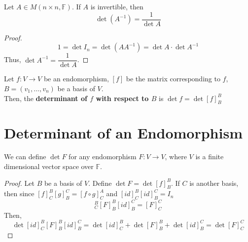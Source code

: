\documentclass[letterpaper,12pt]{article}
\begin{document}
\begin{corollary}
Let $A \in M(n \times n, \mathbb{F})$. If $A$ is invertible, then
\begin{equation*}
    \boxed{\det{(A^{-1})} = \dfrac{1}{\det{A}}}
\end{equation*}
\end{corollary}
\begin{proof}
\begin{equation*}
    1 = \det{I_n} = \det{(AA^{-1})} = \det{A} \cdot \det{A^{-1}}
\end{equation*}
Thus, $\det{A^{-1}} = \dfrac{1}{\det{A}}$.
\end{proof}

\begin{definition}
Let $f: V \rightarrow V$ be an endomorphism, $[f]$ be the matrix corresponding to $f$, $B = (v_1, \dots, v_n)$ be a basis of $V$.
\\ Then, the \textbf{determinant of $f$ with respect to $B$} is $\det{f} = \det{[f]_B^B}$
\end{definition}

\section*{Determinant of an Endomorphism}
\begin{corollary}
We can define $\det{F}$ for any endomorphism $F: V \longrightarrow V$, where $V$ is a finite dimensional vector space over $\mathbb{F}$.
\end{corollary}
\begin{proof}
Let $B$ be a basis of $V$. Define $\det{F} = \det{[f]_B^B}$. If $C$ is another basis, then since $[f]_C^B [g]_B^C = [f \circ g]_C^A$ and $[id]_C^B [id]_B^C = I_n$
\begin{equation*}
    [id]_C^B [F]_B^B [id]_B^C = [F]_C^C
\end{equation*}
Then,
\begin{equation*}
    \det{[id]_C^B [F]_B^B [id]_B^C} = \det{[id]_C^B} + \det{[F]_B^B} + \det{[id]_B^C} = \det{[F]_C^C}
\end{equation*}
\end{proof}
\end{document}
